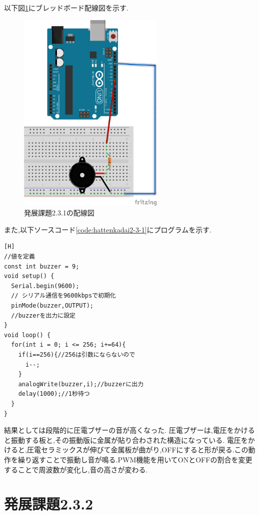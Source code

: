\documentclass{jarticle}
\begin{document}
以下図\ref{fig:hattenkadai2-3-1bread}にブレッドボード配線図を示す.

\begin{figure}[H]
\begin{center}
\includegraphics[width=7.0cm]{images/hatten2-3-1_bread.png}
\caption{発展課題2.3.1の配線図}
\label{fig:hattenkadai2-3-1bread}
\end{center}
\end{figure}

また,以下ソースコード\ref{code:hattenkadai2-3-1}にプログラムを示す.

\begin{lstlisting}[caption=発展課題2.3.1,label=code:hattenkadai2-3-1][H]
//値を定義
const int buzzer = 9;
void setup() {
  Serial.begin(9600);
  // シリアル通信を9600kbpsで初期化
  pinMode(buzzer,OUTPUT);
  //buzzerを出力に設定
}
void loop() {
  for(int i = 0; i <= 256; i+=64){
    if(i==256){//256は引数にならないので
      i--;
    }
    analogWrite(buzzer,i);//buzzerに出力
    delay(1000);//1秒待つ
  }
}
\end{lstlisting}

結果としては段階的に圧電ブザーの音が高くなった.
圧電ブザーは,電圧をかけると振動する板と,その振動版に金属が貼り合わされた構造になっている.
電圧をかけると,圧電セラミックスが伸びて金属板が曲がり,OFFにすると形が戻る.この動作を繰り返すことで振動し音が鳴る.PWM機能を用いてONとOFFの割合を変更することで周波数が変化し,音の高さが変わる.

\section{発展課題2.3.2}
\end{document}
